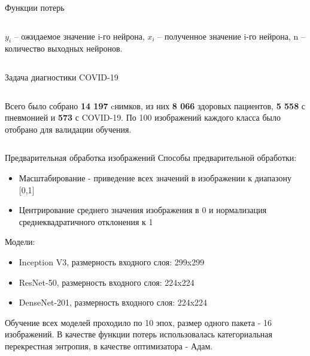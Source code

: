 \documentclass[aspectratio=169]{beamer}
\begin{document}
\begin{frame}{Функции потерь}
    
    \begin{columns}[T]
        \begin{column}{.8\paperwidth}
            $y_i$ – ожидаемое значение i-го нейрона, $x_i$ – полученное значение i-го нейрона, n – количество выходных нейронов.
        \end{column}
    \end{columns}   
\end{frame}

\begin{frame}{Задача диагностики COVID-19}
    \begin{columns}[T]
        \begin{column}{.8\paperwidth}            
            Всего было собрано \textbf{14 197} cнимков, из них \textbf{8 066} здоровых пациентов, \textbf{5 558} с пневмонией и \textbf{573} с COVID-19. По 100 изображений каждого класса было отобрано для валидации обучения.    
        \end{column}
    \end{columns}  
\end{frame}

\begin{frame}{Предварительная обработка изображений}
    Способы предварительной обработки:
    \begin{itemize}    
        \item Масштабирование - приведение всех значений в изображении к диапазону [0,1]
        \item Центрирование среднего значения изображения в 0 и нормализация среднеквадратичного отклонения к 1
    \end{itemize}    
    Модели:
    \begin{itemize}
        \item Inception V3, размерность входного слоя: 299x299
        \item ResNet-50, размерность входного слоя: 224x224
        \item DenseNet-201, размерность входного слоя:  224x224
    \end{itemize} 
    Обучение всех моделей проходило по 10 эпох, размер одного пакета - 16 изображений. В качестве функции потерь использовалась категориальная перекрестная энтропия, в качестве оптимизатора - Адам. 
\end{frame}
\end{document}
